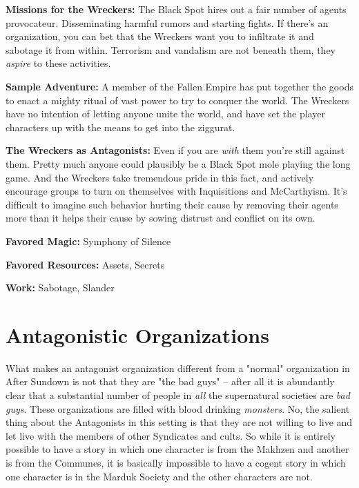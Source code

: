 \textbf{Missions for the Wreckers:} The Black Spot hires out a fair number of agents provocateur. Disseminating harmful rumors and starting fights. If there's an organization, you can bet that the Wreckers want you to infiltrate it and sabotage it from within. Terrorism and vandalism are not beneath them, they \textit{aspire} to these activities.

\textbf{Sample Adventure:} A member of the Fallen Empire has put together the goods to enact a mighty ritual of vast power to try to conquer the world. The Wreckers have no intention of letting anyone unite the world, and have set the player characters up with the means to get into the ziggurat.

\textbf{The Wreckers as Antagonists:} Even if you are \textit{with} them you're still against them. Pretty much anyone could plausibly be a Black Spot mole playing the long game. And the Wreckers take tremendous pride in this fact, and actively encourage groups to turn on themselves with Inquisitions and McCarthyism. It's difficult to imagine such behavior hurting their cause by removing their agents more than it helps their cause by sowing distrust and conflict on its own.

\textbf{Favored Magic:}  Symphony of Silence

\textbf{Favored Resources:} Assets, Secrets

\textbf{Work:} Sabotage, Slander

\section{Antagonistic Organizations}


What makes an antagonist organization different from a "normal" organization in After Sundown is not that they are "the bad guys" -- after all it is abundantly clear that a substantial number of people in \textit{all} the supernatural societies are \textit{bad guys}. These organizations are filled with blood drinking \textit{monsters}. No, the salient thing about the Antagonists in this setting is that they are not willing to live and let live with the members of other Syndicates and cults. So while it is entirely possible to have a story in which one character is from the Makhzen and another is from the Communes, it is basically impossible to have a cogent story in which one character is in the Marduk Society and the other characters are not.

